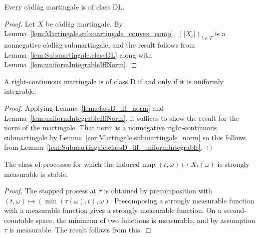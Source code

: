\begin{lemma}\label{lem:Martingale.classDL}
  \leanok
Every càdlàg martingale is of class DL.
\end{lemma}

\begin{proof}\leanok
Let $X$ be càdlàg martingale. By Lemma~\ref{lem:Martingale.submartingale_convex_comp}, $(|X_t|)_{t \in T}$ is a nonnegative càdlàg submartingale, and the result follows from Lemma~\ref{lem:Submartingale.classDL} along with Lemma~\ref{lem:uniformIntegrableIffNorm}.
\end{proof}


\begin{lemma}\label{lem:Martingale.classD_iff_uniformIntegrable}
  \leanok
A right-continuous martingale is of class D if and only if it is uniformly integrable.
\end{lemma}

\begin{proof}\leanok
Applying Lemma~\ref{lem:classD_iff_norm} and Lemma~\ref{lem:uniformIntegrableIffNorm}, it suffices to show the result for the norm of the martingale.
That norm is a nonnegative right-continuous submartingale by Lemma~\ref{cor:Martingale.submartingale_norm} so this follows from Lemma~\ref{lem:Submartingale.classD_iff_uniformIntegrable}.
\end{proof}


\begin{lemma}\label{lem:isStable_stronglyMeasurable_uncurry}
  \leanok
The class of processes for which the induced map $(t,\omega)\mapsto X_t(\omega)$ is strongly measurable is stable.
\end{lemma}

\begin{proof}
The stopped process at $\tau$ is obtained by precomposition with $(t, \omega) \mapsto (\min (\tau(\omega), t), \omega)$.
Precomposing a strongly measurable function with a measurable function gives a strongly measurable function.
On a second-countable space, the minimum of two functions is measurable, and by assumption $\tau$ is measurable.
The result follows from this.
\end{proof}


